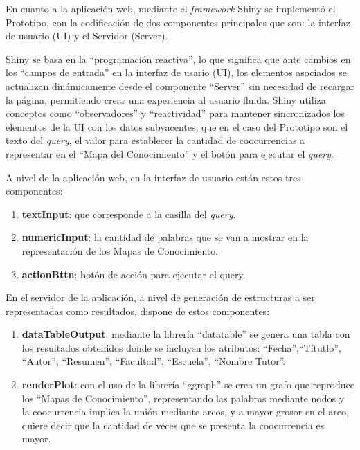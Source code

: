 \documentclass[
  12pt,
  openany]{book}
\begin{document}
En cuanto a la aplicación web, mediante el \emph{framework} Shiny se implementó el Prototipo, con la codificación de dos componentes principales que son: la interfaz de usuario (UI) y el Servidor (Server).

Shiny se basa en la ``programación reactiva'', lo que significa que ante cambios en los ``campos de entrada'' en la interfaz de usario (UI), los elementos asociados se actualizan dinámicamente desde el componente ``Server'' sin necesidad de recargar la página, permitiendo crear una experiencia al usuario fluida. Shiny utiliza conceptos como ``observadores'' y ``reactividad'' para mantener sincronizados los elementos de la UI con los datos subyacentes, que en el caso del Prototipo son el texto del \emph{query}, el valor para establecer la cantidad de coocurrencias a representar en el ``Mapa del Conocimiento'' y el botón para ejecutar el \emph{query}.

\hfill\break
A nivel de la aplicación web, en la interfaz de usuario están estos tres componentes:

\begin{enumerate}
\def\labelenumi{\arabic{enumi}.}
\item
  \textbf{textInput}: que corresponde a la casilla del \emph{query}.
\item
  \textbf{numericInput}: la cantidad de palabras que se van a mostrar en la representación de los Mapas de Conocimiento.
\item
  \textbf{actionBttn}: botón de acción para ejecutar el query.
\end{enumerate}

En el servidor de la aplicación, a nivel de generación de estructuras a ser representadas como resultados, dispone de estos componentes:

\begin{enumerate}
\def\labelenumi{\arabic{enumi}.}
\item
  \textbf{dataTableOutput}: mediante la librería ``datatable'' \citep{DT} se genera una tabla con los resultados obtenidos donde se incluyen los atributos: ``Fecha'',``Títutlo'', ``Autor'', ``Resumen'', ``Facultad'', ``Escuela'', ``Nombre Tutor''.
\item
  \textbf{renderPlot}: con el uso de la librería ``ggraph'' \citep{ggraph} se crea un grafo que reproduce los ``Mapas de Conocimiento'', representando las palabras mediante nodos y la coocurrencia implica la unión mediante arcos, y a mayor grosor en el arco, quiere decir que la cantidad de veces que se presenta la coocurrencia es mayor.
\end{enumerate}
\end{document}
